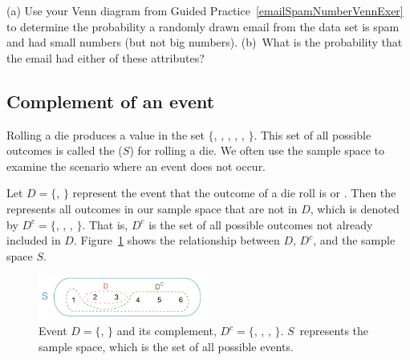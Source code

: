 \begin{exercisewrap}
\begin{nexercise}
(a) Use your Venn diagram from Guided Practice~\ref{emailSpamNumberVennExer} to determine the probability a randomly drawn email from the  data set is spam and had small numbers (but not big numbers). (b)~What is the probability that the email had either of these attributes?\footnotemark
{}
\end{nexercise}
\end{exercisewrap}


\subsection{Complement of an event}

Rolling a die produces a value in the set $\{$, , , , , $\}$. This set of all possible outcomes is called the  ($S$) for rolling a die. We often use the sample space to examine the scenario where an event does not occur.

Let $D=\{$, $\}$ represent the event that the outcome of a die roll is  or . Then the  represents all outcomes in our sample space that are not in $D$, which is denoted by $D^c = \{$, , , $\}$. That is, $D^c$ is the set of all possible outcomes not already included in $D$. Figure~\ref{complementOfD} shows the relationship between $D$, $D^c$, and the sample space $S$.

\begin{figure}[hht]
\centering
\includegraphics[width=0.5\textwidth]{ch_probability/figures/complementOfD/complementOfD}
\caption{Event $D=\{$, $\}$ and its complement, $D^c = \{$, , , $\}$. $S$~represents the sample space, which is the set of all possible events.}
\label{complementOfD}

\end{figure}

